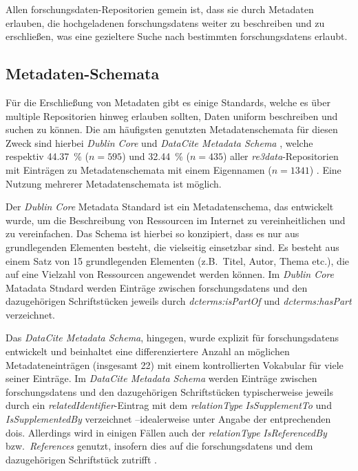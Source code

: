 Allen \gls{forschungsdaten}-Repositorien gemein ist, dass sie durch Metadaten erlauben, die hochgeladenen \glspl{forschungsdaten} weiter zu beschreiben und zu erschließen, was eine gezieltere Suche nach bestimmten \glspl{forschungsdaten} erlaubt.

\subsection{Metadaten-Schemata}\label{sec:forschungsstand-basics-metadata}
Für die Erschließung von Metadaten gibt es einige Standards, welche es über multiple Repositorien hinweg erlauben sollten, Daten uniform beschreiben und suchen zu können.
Die am häufigsten genutzten Metadatenschemata für diesen Zweck sind hierbei \textit{Dublin Core} \autocite{dublincore} und \textit{DataCite Metadata Schema} \autocite{datacite}, welche respektiv \SI{44.37}{\percent} ($n=\num{595}$) und \SI{32.44}{\percent} ($n=\num{435}$) aller \textit{re3data}-Repositorien mit Einträgen zu Metadatenschemata mit einem Eigennamen ($n=\num{1341}$) \autocite{Khan2024,re3data-metadata}.
Eine Nutzung mehrerer Metadatenschemata ist möglich.

Der \textit{Dublin Core} Metadata Standard ist ein Metadatenschema, das entwickelt wurde, um die Beschreibung von Ressourcen im Internet zu vereinheitlichen und zu vereinfachen.
Das Schema ist hierbei so konzipiert, dass es nur aus grundlegenden Elementen besteht, die vielseitig einsetzbar sind.
Es besteht aus einem Satz von \num{15} grundlegenden Elementen (z.B.~Titel, Autor, Thema etc.), die auf eine Vielzahl von Ressourcen angewendet werden können.
Im \textit{Dublin Core} Matadata Stndard werden Einträge zwischen \glspl{forschungsdaten} und den dazugehörigen Schriftstücken jeweils durch \textit{dcterms:isPartOf} und \textit{dcterms:hasPart} verzeichnet.

Das \textit{DataCite Metadata Schema}, hingegen, wurde explizit für \glspl{forschungsdaten} entwickelt und beinhaltet eine differenziertere Anzahl an möglichen Metadateneinträgen (insgesamt \num{22}) mit einem kontrollierten Vokabular für viele seiner Einträge.
Im \textit{DataCite Metadata Schema} werden Einträge zwischen \glspl{forschungsdaten} und den dazugehörigen Schriftstücken typischerweise jeweils durch ein \textit{relatedIdentifier}-Eintrag mit dem \textit{relationType} \textit{IsSupplementTo} und \textit{IsSupplementedBy} verzeichnet \autocite{starr2011iscitedby,Cousijn2019}--idealerweise unter Angabe der entprechenden \glspl{doi}.
Allerdings wird in einigen Fällen auch der \textit{relationType} \textit{IsReferencedBy} bzw.~\textit{References} genutzt, insofern dies auf die \glspl{forschungsdaten} und dem dazugehörigen Schriftstück zutrifft \autocite{Cousijn2019}.

